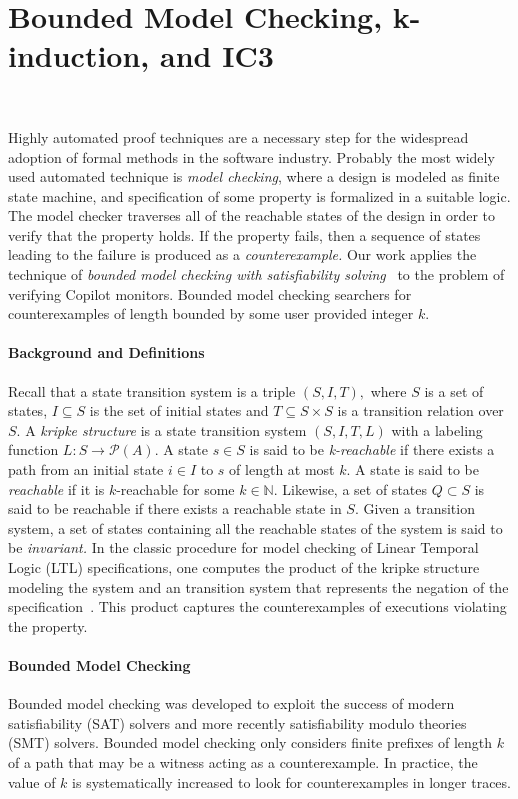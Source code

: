 \section{Bounded Model Checking,  k-induction, and IC3}~\label{sec:mck}

Highly automated proof techniques are a necessary step for the
widespread adoption of formal methods in the software industry.
Probably the most widely used automated technique is {\em model
  checking}, where a design is modeled as finite state machine, and
specification of some property is formalized in a suitable logic.  The
model checker traverses all of the 
reachable states of the design in order to verify that the property
holds.  If the property fails, then a sequence of states leading to
the failure is produced as a {\em counterexample.} Our work applies
the technique of {\em bounded model checking with satisfiability
  solving}~\cite{ClarkeBounded01,ClarkeBounded03} to the problem of
verifying Copilot monitors. Bounded model checking searchers for
counterexamples of length bounded by some user provided integer $k.$


\paragraph{Background and Definitions} Recall that a state transition system is a triple $(S,I,T),$
where $S$ is a set of states, $I \subseteq S$ is the set of initial
states and $T \subseteq S \times S $ is a transition relation over $S.$ A {\em kripke
  structure} is a state transition system $(S,I,T,L)$  with a labeling function
$L: S \rightarrow  \mathcal{P}(A)$.  A state $s 
\in S$ is said to be {\em k-reachable} if there exists a path from an
initial state $i\in I$ to $s$ of length at most $k.$ A state is said
to be {\em reachable} if it is $k$-reachable for some $k\in \mathbb{N}.$
Likewise, a set of states $Q \subset S$ is said to be reachable if
there exists a reachable state in $S.$  Given a transition system, a
set of states containing all the reachable states of the system is
said to be {\em invariant.} In the classic procedure for model checking of Linear
Temporal Logic (LTL) specifications, one computes the product of
the kripke structure modeling the system and an transition system that
represents the negation of the specification~\cite{ClarkeMC}. This product captures
the counterexamples of executions violating the property. 

\paragraph{Bounded Model Checking} Bounded model checking was developed to exploit the success of modern
satisfiability (SAT) solvers and more recently satisfiability modulo
theories (SMT) solvers. Bounded model checking only considers finite
prefixes of length $k$  of a path that may be a witness acting as a
counterexample. In practice, the value of $k$ is systematically
increased to look for counterexamples in longer traces.  

